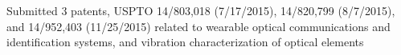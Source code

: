 \item Submitted 3 patents, USPTO 14/803,018 (7/17/2015), 14/820,799 (8/7/2015), and 14/952,403 (11/25/2015) related to wearable optical communications and identification systems, and vibration characterization of optical elements